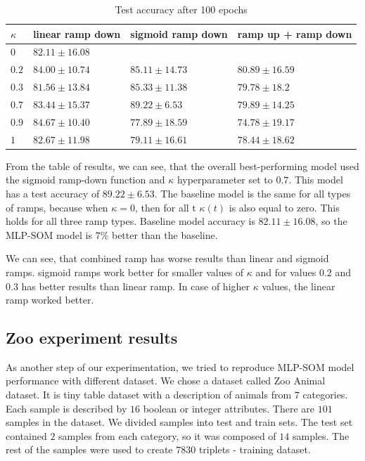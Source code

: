 \begin{table}[h!]
\centering
\begin{tabular}{|l|l|l|l|}
\hline
$\kappa$        & linear ramp down & sigmoid ramp down & ramp up + ramp down \\ \hline
$0$   &  \color{purple} $82.11	\pm 16.08$ &                         &  \\ \hline
$0.2$ &  $84.00	\pm 10.74$ &  $85.11	\pm 14.73$   &  $80.89	\pm 16.59$ \\ \hline
$0.3$ &  $81.56	\pm 13.84$ &  $85.33	\pm 11.38$   &  $79.78	\pm 18.2$  \\ \hline
$0.7$ &  $83.44	\pm 15.37$ & \color{purple} $89.22	\pm  6.53$   &  $79.89	\pm 14.25$ \\ \hline
$0.9$ &  $84.67	\pm 10.40$ &  $77.89	\pm 18.59$   &  $74.78	\pm 19.17$ \\ \hline
$1$   &  $82.67	\pm 11.98$ &  $79.11	\pm 16.61$   &  $78.44	\pm 18.62$ \\ \hline

\end{tabular}
\caption{Test accuracy after 100 epochs}
\label{exp5-res-table}
\end{table}


From the table of results, we can see, that the overall best-performing model used the sigmoid ramp-down function and $\kappa$ hyperparameter set to $0.7$. This model has a test accuracy of $89.22	\pm  6.53$. The baseline model is the same for all types of ramps, because when $\kappa = 0$, then for all t $\kappa(t)$ is also equal to zero. This holds for all three ramp types. Baseline model accuracy is $82.11	\pm 16.08$, so the MLP-SOM model is $7\%$ better than the baseline. 

We can see, that combined ramp has worse results than linear and sigmoid ramps. sigmoid ramps work better for smaller values of $\kappa$ and for values $0.2$ and $0.3$ has better results than linear ramp. In case of higher $\kappa$ values, the linear ramp worked better.


\subsection{Zoo experiment results}
As another step of our experimentation, we tried to reproduce MLP-SOM model performance with different dataset. We chose a dataset called Zoo Animal dataset. It is tiny table dataset with a description of animals from $7$ categories. Each sample is described by $16$ boolean or integer attributes. There are $101$ samples in the dataset. We divided samples into test and train sets. The test set contained $2$ samples from each category, so it was composed of $14$ samples. The rest of the samples were used to create $7830$ triplets - training dataset.

